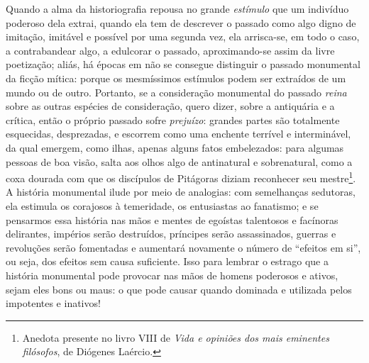 Quando a alma da historiografia repousa no grande \emph{estímulo} que um
indivíduo poderoso dela extrai, quando ela tem de descrever o passado
como algo digno de imitação, imitável e possível por uma segunda vez,
ela arrisca-se, em todo o caso, a contrabandear algo, a edulcorar o
passado, aproximando-se assim da livre poetização; aliás, há épocas em
não se consegue distinguir o passado monumental da ficção mítica: porque
os mesmíssimos estímulos podem ser extraídos de um mundo ou de outro.
Portanto, se a consideração monumental do passado \emph{reina} sobre as
outras espécies de consideração, quero dizer, sobre a antiquária e a
crítica, então o próprio passado sofre \emph{prejuízo}: grandes partes
são totalmente esquecidas, desprezadas, e escorrem como uma enchente
terrível e interminável, da qual emergem, como ilhas, apenas alguns
fatos embelezados: para algumas pessoas de boa visão, salta aos olhos
algo de antinatural e sobrenatural, como a coxa dourada com que os
discípulos de Pitágoras diziam reconhecer seu mestre\footnote{Anedota
  presente no livro VIII de \emph{Vida e opiniões dos mais eminentes
  filósofos}, de Diógenes Laércio.}. A história monumental ilude por
meio de analogias: com semelhanças sedutoras, ela estimula os corajosos
à temeridade, os entusiastas ao fanatismo; e se pensarmos essa história
nas mãos e mentes de egoístas talentosos e facínoras delirantes,
impérios serão destruídos, príncipes serão assassinados, guerras e
revoluções serão fomentadas e aumentará novamente o número de ``efeitos
em si'', ou seja, dos efeitos sem causa suficiente. Isso para lembrar o
estrago que a história monumental pode provocar nas mãos de homens
poderosos e ativos, sejam eles bons ou maus: o que pode causar quando
dominada e utilizada pelos impotentes e inativos!

